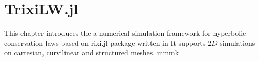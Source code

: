 \documentclass[12pt]{article}
\begin{document}
\section{TrixiLW.jl}
This chapter introduces the a numerical simulation framework for hyperbolic conservation laws based on rixi.jl package written in  It supports $2D$ simulations on cartesian, curvilinear and structured meshes. mmmk
\end{document}
